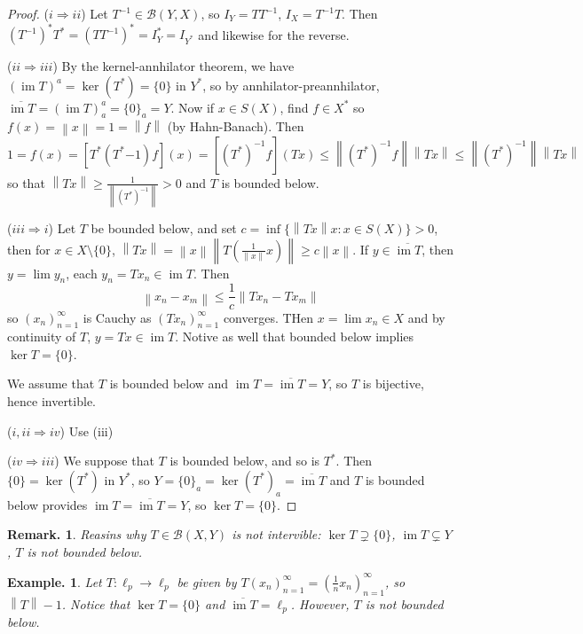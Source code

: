 \documentclass[11pt, a4paper]{memoir}
\newcommand{\imp}[2]{($#1\Rightarrow#2$)\hspace{0.2cm}}
\newcommand{\norm}[1]{\ensuremath{\left\lVert#1\right\rVert}}
\theoremstyle{change}
\theoremstyle{plain}
\theoremstyle{nonumberplain}
\newtheorem{example}{Example.}
\newtheorem{remark}{Remark.}
\newtheorem{proof}{Proof}
\DeclareMathOperator{\im}{im}
\numberwithin{equation}{section}
\begin{document}
\begin{proof}
    \imp{i}{ii}
    Let $T^{-1}\in \mathcal{B}(Y,X)$, so $I_Y=TT^{-1}$, $I_X=T^{-1}T$.
    Then $(T^{-1})^*T^*=(TT^{-1})^*=I_Y^*=I_{Y^*}$ and likewise for the reverse.

    \imp{ii}{iii}
    By the kernel-annhilator theorem, we have $(\im T)^a=\ker(T^*)=\{0\}$ in $Y^*$, so by annhilator-preannhilator, $\overline{\im T}=(\im T)^a_a=\{0\}_a=Y$.
    Now if $x\in S(X)$, find $f\in X^*$ so $f(x)=\norm{x}=1=\norm{f}$ (by Hahn-Banach).
    Then
   \begin{equation*}
        1=f(x)=[T^*(T^*{-1})f](x)=[(T^*)^{-1}f](Tx)\leq\norm{(T^*)^{-1}f}\norm{Tx}\leq\norm{(T^*)^{-1}}\norm{Tx}
    \end{equation*}
    so that $\norm{Tx}\geq\frac{1}{\norm{(T^*)^{-1}}}>0$ and $T$ is bounded below.

    \imp{iii}{i}
    Let $T$ be bounded below, and set $c=\inf\{\norm{Tx}x:x\in S(X)\}>0$, then for $x\in X\setminus\{0\}$, $\norm{Tx}=\norm{x}\norm{T\left(\frac{1}{\norm{x}}x\right)}\geq c\norm{x}$.
    If $y\in\overline{\im T}$, then $y=\lim y_n$, each $y_n=Tx_n\in\im T$.
    Then
    \begin{equation*}
        \norm{x_n-x_m}\leq\frac{1}{c}\norm{Tx_n-Tx_m}
    \end{equation*}
    so $(x_n)_{n=1}^\infty$ is Cauchy as $(Tx_n)_{n=1}^\infty$ converges.
    THen $x=\lim x_n\in X$ and by continuity of $T$, $y=Tx\in\im T$.
    Notive as well that bounded below implies $\ker T=\{0\}$.

    We assume that $T$ is bounded below and $\im T=\overline{\im T}=Y$, so $T$ is bijective, hence invertible.

    \imp{i,ii}{iv}
    Use (iii)

    \imp{iv}{iii}
    We suppose that $T$ is bounded below, and so is $T^*$.
    Then $\{0\}=\ker(T^*)$ in $Y^*$, so $Y=\{0\}_a=\ker(T^*)_a=\overline{\im T}$ and $T$ is bounded below provides $\im T=\overline{\im T}=Y$, so $\ker T=\{0\}$.
\end{proof}
\begin{remark}
    Reasins why $T\in\mathcal{B}(X,Y)$ is not intervible: $\ker T\supsetneq\{0\}$, $\im T\subsetneq Y$, $T$ is not bounded below.
\end{remark}
\begin{example}
    Let $T:\ell_p\to\ell_p$ be given by $T(x_n)_{n=1}^\infty=\left(\frac{1}{n}x_n\right)_{n=1}^\infty$, so $\norm{T}-1$.
    Notice that $\ker T=\{0\}$ and $\overline{\im T}=\ell_p$.
    However, $T$ is not bounded below.
\end{example}
\end{document}
